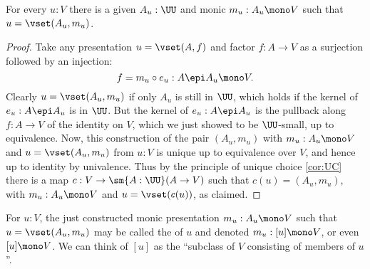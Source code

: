 \begin{lem}\label{lem:MonicSetPresent}
For every $u:V$ there is a given $A_u:\UU$ and monic $m_u: A_u \mono V$ such that $u = \vset(A_u, m_u)$.
\end{lem}

\begin{proof}
  Take any presentation $u = \vset(A,f)$ and factor $f:A\to V$ as a surjection followed by an injection:
  \begin{equation*}
    f = m_u\circ e_u : A \epi A_u \mono V.
  \end{equation*}
  Clearly $u = \vset(A_u, m_u)$ if only $A_u$ is still in $\UU$, which holds if the kernel of $e_u : A \epi A_u$ is in $\UU$.  But the kernel of $e_u : A \epi A_u$ is the pullback along $f : A\to V$ of the identity on $V$, which we just showed to be $\UU$-small, up to equivalence.  Now, this construction of the pair $(A_u, m_u)$ with $m_u :A_u \mono V$ and $u = \vset(A_u, m_u)$ from $u:V$ is unique up to equivalence over $V$, and hence up to identity by univalence.  Thus by the principle of unique choice \eqref{cor:UC} there is a map $c : V\to\sm{A:\UU}(A\to V)$ such that $c(u) = (A_u, m_u)$, with $m_u :A_u \mono V$ and $u = \vset(c(u))$, as claimed.
\end{proof}

\begin{defn}\label{def:TypeOfElements}
  For $u:V$, the just constructed monic presentation $m_u: A_u \mono V$ such that $u = \vset(A_u, m_u)$ may be called the 
  of $u$ and denoted $m_u : [u] \mono V$, or even $[u] \mono V$.  We can think of $[u]$ as the ``subclass of $V$ consisting of members of $u$''.
\end{defn}

